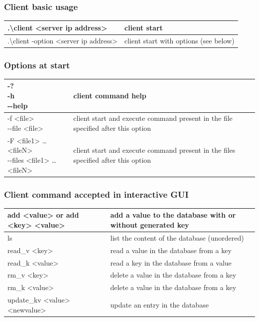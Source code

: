 \documentclass[a4paper,11pt]{report}
\begin{document}
    \begin{centering}
        \subsubsection*{Client basic usage}
        \begin{tabular}{|m{6cm}|m{6cm}|}

            \hline
            .\textbackslash client <server ip address> & client start \\
            \hline
            .\textbackslash client -option <server ip address> & client start with options (see below) \\
            \hline
        \end{tabular}
        \subsubsection*{Options at start}
        \begin{tabular}{|m{4.5cm}|m{10.5cm}|}
            \hline
            \shortstack{-? \\ -h \\ -{}-help} & client command help \\
            \hline
            \shortstack{-f <file> \\ -{}-file <file>} & client start and execute command present in the file specified after this option \\
            \hline
            \shortstack{-F <file1> \ldots <fileN> \\ -{}-files <file1> \ldots <fileN>} & client start and execute command present in the files specified after this option \\
            \hline
        \end{tabular}

        \subsubsection*{Client command accepted in interactive GUI}
        \begin{tabular}{|m{7cm}|m{8cm}|}
            \hline
            add <value> or add <key> <value> & add a value to the database with or without generated key \\
            \hline
            ls & list the content of the database (unordered) \\
            \hline
            read\_v <key> & read a value in the database from a key \\
            \hline
            read\_k <value> & read a key in the database from a value \\
            \hline
            rm\_v <key> & delete a value in the database from a key \\
            \hline
            rm\_k <value> & delete a value in the database from a key \\
            \hline
            update\_kv <value> <newvalue> & update an entry in the database \\
            \hline
        \end{tabular}
    \end{centering}
\end{document}
